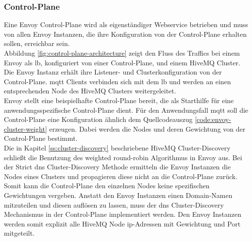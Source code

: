 \subsubsection{Control-Plane} \label{ss:control-plane}
Eine Envoy Control-Plane wird als eigenständiger Webservice betrieben und muss von allen Envoy Instanzen, die ihre Konfiguration von der Control-Plane erhalten sollen, erreichbar sein.
\\
Abbildung \ref{fig:control-plane-architecture} zeigt den Fluss des Traffics bei einem Envoy als \acl{lb}, konfiguriert von einer Control-Plane, und einem HiveMQ Cluster. Die Envoy Instanz erhält ihre Listener- und Clusterkonfiguration von der Control-Plane. \ac{mqtt} Clients verbinden sich mit dem \ac{lb} und werden an einen entsprechenden Node des HiveMQ Clusters weitergeleitet.
\\
Envoy stellt eine beispielhafte Control-Plane \cite{DynamicConfigurationControl} bereit, die als Starthilfe für eine anwendungsspezifische Control-Plane dient. Für den Anwendungsfall \ac{mqtt} soll die Control-Plane eine Konfiguration ähnlich dem Quellcodeauszug \ref{code:envoy-cluster-weight} erzeugen. Dabei werden die Nodes und deren Gewichtung von der Control-Plane bestimmt.
\\
Die in Kapitel \ref{ss:cluster-discovery} beschriebene HiveMQ Cluster-Discovery schlie{\ss}t die Benutzung des weighted round-robin Algorithmus in Envoy aus.
Bei der Strict \ac{dns} Cluster-Discovery Methode ermitteln die Envoy Instanzen die Nodes eines Clusters und propagieren diese nicht an die Control-Plane zurück. Somit kann die Control-Plane den einzelnen Nodes keine spezifischen Gewichtungen vergeben.
Anstatt den Envoy Instanzen einen Domain-Namen mitzuteilen und diesen auflösen zu lassen, muss der \ac{dns} Cluster-Discovery Mechanismus in der Control-Plane implementiert werden. Den Envoy Instanzen werden somit explizit alle HiveMQ Node \ac{ip}-Adressen mit Gewichtung und Port mitgeteilt.
